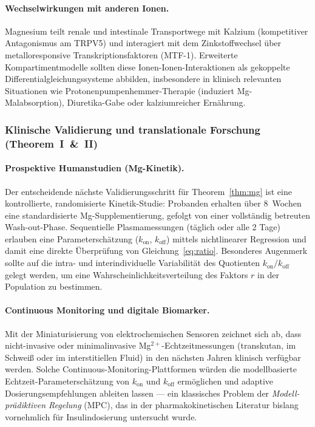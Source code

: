 ﻿\documentclass[12pt,a4paper]{article}
\theoremstyle{plain}
\theoremstyle{definition}
\theoremstyle{remark}
\begin{document}
\paragraph{Wechselwirkungen mit anderen Ionen.}
Magnesium teilt renale und intestinale Transportwege mit Kalzium
(kompetitiver Antagonismus am TRPV5) und interagiert mit dem
Zinkstoffwechsel über metalloresponsive Transkriptionsfaktoren (MTF-1).
Erweiterte Kompartimentmodelle sollten diese Ionen-Ionen-Interaktionen
als gekoppelte Differentialgleichungssysteme abbilden, insbesondere in
klinisch relevanten Situationen wie Protonenpumpenhemmer-Therapie
(induziert Mg-Malabsorption), Diuretika-Gabe oder kalziumreicher Ernährung.

\subsubsection{Klinische Validierung und translationale Forschung
  (Theorem~I~\&~II)}

\paragraph{Prospektive Humanstudien (Mg-Kinetik).}
Der entscheidende nächste Validierungsschritt für Theorem~\ref{thm:mg} ist
eine kontrollierte, randomisierte Kinetik-Studie: Probanden erhalten über
8~Wochen eine standardisierte Mg-Supplementierung, gefolgt von einer
vollständig betreuten Wash-out-Phase. Sequentielle Plasmamessungen (täglich
oder alle 2 Tage) erlauben eine Parameterschätzung ($k_\text{on}$,
$k_\text{off}$) mittels nichtlinearer Regression und damit eine direkte
Überprüfung von Gleichung~\eqref{eq:ratio}. Besonderes Augenmerk sollte
auf die intra- und interindividuelle Variabilität des Quotienten
$k_\text{on}/k_\text{off}$ gelegt werden, um eine Wahrscheinlichkeitsverteilung
des Faktors $r$ in der Population zu bestimmen.

\paragraph{Continuous Monitoring und digitale Biomarker.}
Mit der Miniaturisierung von elektrochemischen Sensoren zeichnet sich ab,
dass nicht-invasive oder minimalinvasive Mg$^{2+}$-Echtzeitmessungen
(transkutan, im Schweiß oder im interstitiellen Fluid) in den nächsten Jahren
klinisch verfügbar werden. Solche Continuous-Monitoring-Plattformen würden
die modellbasierte Echtzeit-Parameterschätzung von $k_\text{on}$ und
$k_\text{off}$ ermöglichen und adaptive Dosierungsempfehlungen ableiten lassen
--- ein klassisches Problem der \emph{Modell-prädiktiven Regelung} (MPC), das in
der pharmakokinetischen Literatur bislang vornehmlich für
Insulindosierung untersucht wurde.
\end{document}
